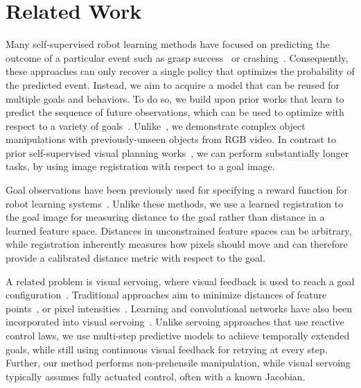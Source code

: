 \vspace{-0.1cm}
\section{Related Work}
\vspace{-0.1cm}
Many self-supervised robot learning methods have focused on predicting the outcome of a particular event such as grasp success~\cite{lerrel,google_handeye,princeton_pushgrasp} or crashing~\cite{crashing,greg_kahn_uncertainty}. Consequently, these approaches can only recover a single policy that optimizes the probability of the predicted event. Instead, we aim to acquire a model that can be reused for multiple goals and behaviors. To do so, we build upon prior works that learn to predict the sequence of future observations, which can be used to optimize with respect to a variety of goals~\cite{foresight,sna,se3_control}. Unlike~\cite{se3_control}, we demonstrate complex object manipulations with previously-unseen objects from RGB video. In contrast to prior self-supervised visual planning works~\cite{foresight,sna}, we can perform substantially longer tasks, by using image registration with respect to a goal image.

Goal observations have been previously used for specifying a reward function for robot learning systems~\cite{jagersand1995visual,deguchi1999image,e2c,dsae}. Unlike these methods, we use a learned registration to the goal image for measuring distance to the goal rather than distance in a learned feature space. Distances in unconstrained feature spaces can be arbitrary, while registration inherently measures how pixels should move and can therefore provide a calibrated distance metric with respect to the goal. 

A related problem is visual servoing, where visual feedback is used to reach a goal configuration~\cite{hutchinson1996tutorial,kragic2002survey,desouza2002survey}.
Traditional approaches aim to minimize distances of feature points~\cite{feddema1989vision,espiau1992servo,wilson1996relative}, or pixel intensities~\cite{caron2013photometric}. Learning and convolutional networks have also been incorporated into visual servoing~\cite{saxena2017servoing,bateux2018servoing,lee2017servoing,google_handeye}. Unlike servoing approaches that use reactive control laws, we use multi-step predictive models to achieve temporally extended goals, while still using continuous visual feedback for retrying at every step. Further, our method performs non-prehensile manipulation, while visual servoing typically assumes fully actuated control, often with a known Jacobian.

